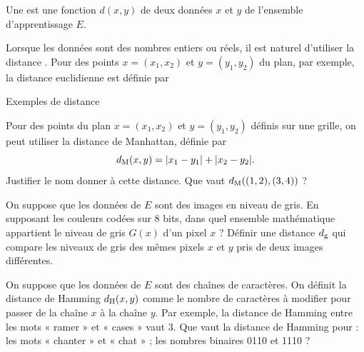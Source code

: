 \documentclass[12pt,fancy]{cours}
\begin{document}
\begin{definition}[Distance]\label{def:dist}
    Une  est une fonction $d(x,y)$ de deux données $x$ et $y$ de l'ensemble d'apprentissage $E$.
\end{definition}
Lorsque les données sont des nombres entiers ou réels, il est naturel d'utiliser la distance . Pour des points $x=(x_1,x_2)$ et $y=(y_1,y_2)$ du plan, par exemple, la distance euclidienne est définie par 
\begin{exemple}{Exemples de distance}
\begin{quest}
    \item Pour des points du plan $x=(x_1,x_2)$ et $y=(y_1,y_2)$ définis sur une grille, on peut utiliser la distance de Manhattan, définie par 
    \begin{equation}
        d_{\rm M}(x,y) = |x_1-y_1| + |x_2 - y_2|.
    \end{equation} 
    Justifier le nom donner à cette distance. Que vaut $d_{\rm M}((1,2),(3,4))$ ?
    \item On suppose que les données de $E$ sont des images en niveau de gris. En supposant les couleurs codées sur $8$ bits, dans quel ensemble mathématique appartient le niveau de gris $G(x)$ d'un pixel $x$ ? Définir une distance $d_{\rm g}$ qui compare les niveaux de gris des mêmes pixels $x$ et $y$ pris de deux images différentes. 
    \item On suppose que les données de $E$ sont des chaînes de caractères. On définit la distance de Hamming $d_{\rm H}(x,y)$ comme le nombre de caractères à modifier pour passer de la chaîne $x$ à la chaîne $y$. Par exemple, la distance de Hamming entre les mots « ramer » et « cases » vaut $3$. Que vaut la distance de Hamming pour : les mots « chanter » et « chat » ; les nombres binaires 0110 et 1110 ? 
    \end{quest}    
\end{exemple}
\end{document}
